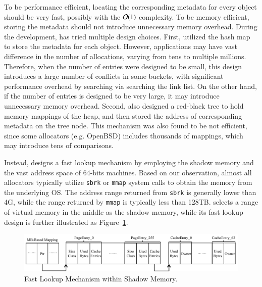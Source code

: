 To be performance efficient, locating the corresponding metadata for every object should be very fast, possibly with the $\mathcal{O}(1)$ complexity.  To be memory efficient, storing the metadata should not introduce unnecessary memory overhead. During the development, \MP{} has tried multiple design choices. First, \MP{} utilized the hash map to store the metadata for each object. However, applications may have vast difference in the number of allocations, varying from tens to multiple millions. Therefore, when the number of entries were designed to be small, this design introduces a large number of conflicts in some buckets, with significant performance overhead by searching via searching the link list. On the other hand, if the number of entries is designed to be very large, it may introduce unnecessary memory overhead. Second, \MP{} also designed a red-black tree to hold memory mappings of the heap, and then stored the address of corresponding metadata on the tree node. This mechanism was also found to be not efficient, since some allocators (e.g. OpenBSD)  includes thousands of mappings, which may introduce tens of comparisons. 

Instead, \MP{} designs a fast lookup mechanism by employing the shadow memory and the vast address space of 64-bits machines. Based on our observation, almost all allocators typically utilize \texttt{sbrk} or \texttt{mmap} system calls to obtain the memory from the underlying OS. The address range returned from \texttt{sbrk} is generally lower than 4G, while the range returned by \texttt{mmap} is typically less than 128TB. 
\MP{} selects a range of virtual memory in the middle as the shadow memory, while its fast lookup design is further illustrated as Figure~\ref{fig:lookup}. 
          
\begin{figure}[!ht]
\centering
\includegraphics[width=6.3in]{figures/lookup}
\caption{Fast Lookup Mechanism within Shadow Memory.\label{fig:lookup}}
\end{figure}

